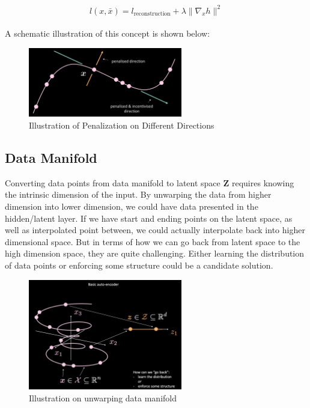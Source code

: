 $$l(x,\bar{x}) = l_{\text{reconstruction}} + \lambda \| \nabla_x h \|^2$$
\\
A schematic illustration of this concept is shown below: 
\\
\begin{figure}[H]
    \centering
    \includegraphics[width=0.6\textwidth]{labs/10/images/Contractive_AutoEncoder.png}
    \caption{Illustration of Penalization on Different Directions}
    \label{fig:Contractive_AutoEncoder}
\end{figure}

\subsection{Data Manifold}

Converting data points from data manifold to latent space \textbf{Z} requires knowing the intrinsic dimension of the input. By unwarping the data from higher dimension into lower dimension, we could have data presented in the hidden/latent layer. If we have start and ending points on the latent space, as well as interpolated point between, we could actually interpolate back into higher dimensional space. But in terms of how we can go back from latent space to the high dimension space, they are quite challenging. Either learning the distribution of data points or enforcing some structure could be a candidate solution.
\\
\begin{figure}[htb]
    \centering
    \includegraphics[width=0.6\textwidth]{labs/10/images/Data_manifold.png}
    \caption{Illustration on unwarping data manifold}
    \label{fig:Data_manifold}
\end{figure}
\\






